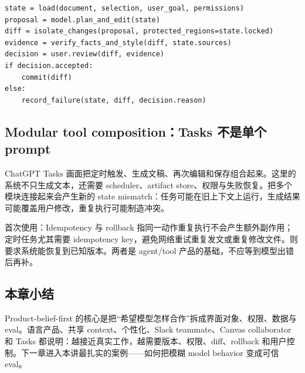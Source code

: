 \begin{lstlisting}[caption={带控制权的文档协作循环}]
state = load(document, selection, user_goal, permissions)
proposal = model.plan_and_edit(state)
diff = isolate_changes(proposal, protected_regions=state.locked)
evidence = verify_facts_and_style(diff, state.sources)
decision = user.review(diff, evidence)
if decision.accepted:
    commit(diff)
else:
    record_failure(state, diff, decision.reason)
\end{lstlisting}


\subsection{Modular tool composition：Tasks 不是单个 prompt}

ChatGPT Tasks 画面把定时触发、生成文稿、再次编辑和保存组合起来。这里的系统不只生成文本，还需要 scheduler、artifact store、权限与失败恢复。把多个模块连接起来会产生新的 state mismatch：任务可能在旧上下文上运行，生成结果可能覆盖用户修改，重复执行可能制造冲突。


\begin{knowledgebox}{首次使用：Idempotency 与 rollback}
指同一动作重复执行不会产生额外副作用；定时任务尤其需要 idempotency key，避免网络重试重复发文或重复修改文件。则要求系统能恢复到已知版本。两者是 agent/tool 产品的基础，不应等到模型出错后再补。
\end{knowledgebox}

\subsection{本章小结}

Product-belief-first 的核心是把“希望模型怎样合作”拆成界面对象、权限、数据与 eval。语言产品、共享 context、个性化、Slack teammate、Canvas collaborator 和 Tasks 都说明：越接近真实工作，越需要版本、权限、diff、rollback 和用户控制。下一章进入本讲最扎实的案例——如何把模糊 model behavior 变成可信 eval。

